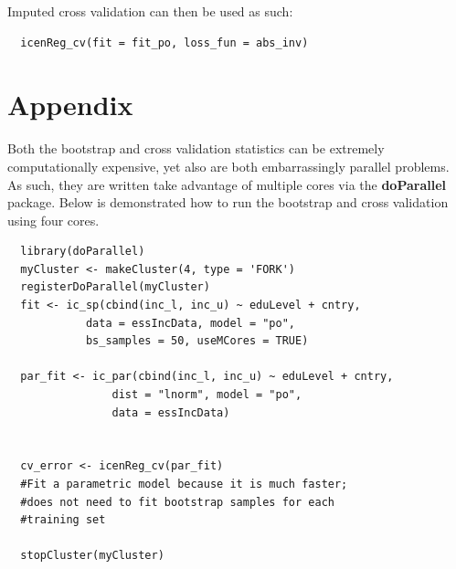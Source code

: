 \documentclass[11pt]{report}
\begin{document}
  Imputed cross validation can then be used as such:
  
  \begin{verbatim}
  icenReg_cv(fit = fit_po, loss_fun = abs_inv)
  \end{verbatim}
  
  
  \section{Appendix}
  
  Both the bootstrap and cross validation statistics can be extremely computationally
  expensive, yet also are both embarrassingly parallel problems. As such, they are 
  written take advantage of multiple cores via the {\bf doParallel} package. 
  Below is demonstrated how to run the bootstrap and cross validation using 
  four cores. 
  
  
  \begin{verbatim}
  library(doParallel)
  myCluster <- makeCluster(4, type = 'FORK')
  registerDoParallel(myCluster)
  fit <- ic_sp(cbind(inc_l, inc_u) ~ eduLevel + cntry,
            data = essIncData, model = "po",
            bs_samples = 50, useMCores = TRUE)
            
  par_fit <- ic_par(cbind(inc_l, inc_u) ~ eduLevel + cntry,
                dist = "lnorm", model = "po",
                data = essIncData)
                

  cv_error <- icenReg_cv(par_fit)
  #Fit a parametric model because it is much faster;
  #does not need to fit bootstrap samples for each
  #training set
  
  stopCluster(myCluster)
  \end{verbatim}
  
  
\end{document}
